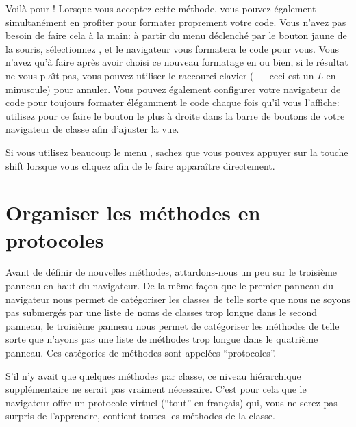 \documentclass[a4paper,10pt,twoside]{book}
\begin{document}
Voilà pour !  Lorsque vous acceptez cette méthode, vous
pouvez également simultanément en profiter pour formater proprement
votre code. Vous n'avez pas besoin de faire cela à la main: à partir
du menu déclenché par le bouton jaune de la souris, sélectionnez
, et le navigateur vous formatera
le code pour vous. Vous n'avez qu'à faire  après avoir 
choisi ce nouveau formatage en  ou 
bien, si le résultat ne vous pla\^{\i}t pas, vous pouvez utiliser 
le raccourci-clavier 
(\,---\, ceci est un \emph{L} en minuscule) pour annuler.
Vous pouvez également configurer votre navigateur de code pour
toujours formater élégamment le code chaque fois qu'il vous
l'affiche:
utilisez pour ce faire le bouton le plus à droite dans la barre de
boutons de votre navigateur de classe afin d'ajuster la vue.

Si vous utilisez beaucoup le menu , sachez que
vous pouvez appuyer sur la touche {\sc shift} lorsque vous cliquez
afin de le faire apparaître directement.

\section{Organiser les méthodes en protocoles}

Avant de définir de nouvelles méthodes, attardons-nous un peu sur le troisième panneau en haut du navigateur.
De la m\^eme façon que le premier panneau du navigateur nous permet de catégoriser les classes de telle sorte que nous ne soyons pas submergés par une liste de noms de classes trop longue dans le second panneau, le troisième panneau nous permet de catégoriser les méthodes de telle sorte que n'ayons pas une liste de méthodes trop longue dans le quatrième panneau.
Ces catégories de méthodes sont appelées ``protocoles''.

S'il n'y avait que quelques méthodes par classe, ce niveau hiérarchique supplémentaire ne serait pas vraiment nécessaire.
C'est pour cela que le navigateur offre un protocole virtuel
 (\cad ``tout'' en fran\c{c}ais) qui, vous ne serez pas surpris de l'apprendre, contient toutes les méthodes de la classe.
\end{document}
